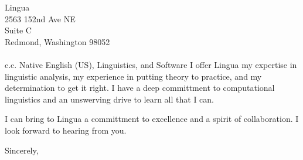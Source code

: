 \documentclass{letter} %
\begin{document}
\begin{letter}{Lingua \\
2563 152nd Ave NE\\
Suite C\\
Redmond, Washington 98052\\
{}\quad\\
c.c. Native English (US), Linguistics, and Software}
\noindent I offer Lingua my expertise in linguistic analysis, my experience in putting theory to practice, and my determination to get it right. I have a deep committment to computational linguistics and an unswerving drive to learn all that I can.  

\noindent I can bring to Lingua a committment to excellence and a spirit of collaboration. I look forward to hearing from you.

  

\closing{Sincerely,} 
 
\end{letter}
 
\end{document}
